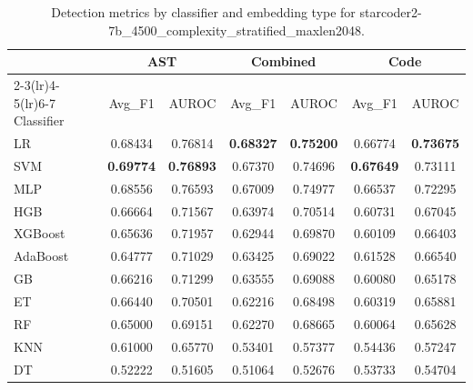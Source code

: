 \begin{table}[t]
\centering
\caption{Detection metrics by classifier and embedding type for starcoder2-7b\_4500\_complexity\_stratified\_maxlen2048.}
\label{tab:rq2d_starcoder2-7b_4500_complexity_stratified_maxlen2048}
\begin{tabular}{l cc cc cc}
\toprule
 & \multicolumn{2}{c}{AST} & \multicolumn{2}{c}{Combined} & \multicolumn{2}{c}{Code} \\
\cmidrule(lr){2-3}\cmidrule(lr){4-5}\cmidrule(lr){6-7}
Classifier & Avg\_F1 & AUROC & Avg\_F1 & AUROC & Avg\_F1 & AUROC \\
\midrule
LR & 0.68434 & 0.76814 & \textbf{0.68327} & \textbf{0.75200} & 0.66774 & \textbf{0.73675} \\
SVM & \textbf{0.69774} & \textbf{0.76893} & 0.67370 & 0.74696 & \textbf{0.67649} & 0.73111 \\
MLP & 0.68556 & 0.76593 & 0.67009 & 0.74977 & 0.66537 & 0.72295 \\
HGB & 0.66664 & 0.71567 & 0.63974 & 0.70514 & 0.60731 & 0.67045 \\
XGBoost & 0.65636 & 0.71957 & 0.62944 & 0.69870 & 0.60109 & 0.66403 \\
AdaBoost & 0.64777 & 0.71029 & 0.63425 & 0.69022 & 0.61528 & 0.66540 \\
GB & 0.66216 & 0.71299 & 0.63555 & 0.69088 & 0.60080 & 0.65178 \\
ET & 0.66440 & 0.70501 & 0.62216 & 0.68498 & 0.60319 & 0.65881 \\
RF & 0.65000 & 0.69151 & 0.62270 & 0.68665 & 0.60064 & 0.65628 \\
KNN & 0.61000 & 0.65770 & 0.53401 & 0.57377 & 0.54436 & 0.57247 \\
DT & 0.52222 & 0.51605 & 0.51064 & 0.52676 & 0.53733 & 0.54704 \\
\bottomrule
\end{tabular}
\end{table}
